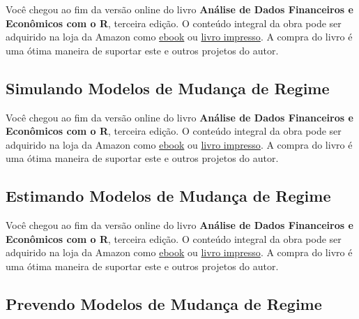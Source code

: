 \documentclass[
  11pt,
]{book}
\newenvironment{pleasebuyit}
{\begin{noteblock}
		
	} {\end{noteblock}}
\begin{document}
\begin{pleasebuyit}
Você chegou ao fim da versão online do livro \textbf{Análise de Dados
Financeiros e Econômicos com o R}, terceira edição. O conteúdo integral
da obra pode ser adquirido na loja da Amazon como
\href{https://www.amazon.com.br/dp/B08WNC27ZY}{ebook} ou
\href{https://www.amazon.com/dp/B08WP8CCDB}{livro impresso}. A compra do
livro é uma ótima maneira de suportar este e outros projetos do autor.
\end{pleasebuyit}

\hypertarget{simulando-modelos-de-mudanuxe7a-de-regime}{%
\subsection{Simulando Modelos de Mudança de Regime}\label{simulando-modelos-de-mudanuxe7a-de-regime}}

\begin{pleasebuyit}
Você chegou ao fim da versão online do livro \textbf{Análise de Dados
Financeiros e Econômicos com o R}, terceira edição. O conteúdo integral
da obra pode ser adquirido na loja da Amazon como
\href{https://www.amazon.com.br/dp/B08WNC27ZY}{ebook} ou
\href{https://www.amazon.com/dp/B08WP8CCDB}{livro impresso}. A compra do
livro é uma ótima maneira de suportar este e outros projetos do autor.
\end{pleasebuyit}

\hypertarget{estimando-modelos-de-mudanuxe7a-de-regime}{%
\subsection{Estimando Modelos de Mudança de Regime}\label{estimando-modelos-de-mudanuxe7a-de-regime}}

\begin{pleasebuyit}
Você chegou ao fim da versão online do livro \textbf{Análise de Dados
Financeiros e Econômicos com o R}, terceira edição. O conteúdo integral
da obra pode ser adquirido na loja da Amazon como
\href{https://www.amazon.com.br/dp/B08WNC27ZY}{ebook} ou
\href{https://www.amazon.com/dp/B08WP8CCDB}{livro impresso}. A compra do
livro é uma ótima maneira de suportar este e outros projetos do autor.
\end{pleasebuyit}

\hypertarget{prevendo-modelos-de-mudanuxe7a-de-regime}{%
\subsection{Prevendo Modelos de Mudança de Regime}\label{prevendo-modelos-de-mudanuxe7a-de-regime}}
\end{document}
